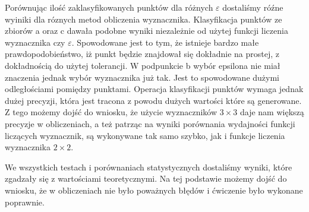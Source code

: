 \quad Porównując ilość zaklasyfikowanych punktów dla różnych $\varepsilon$ dostaliśmy róźne wyiniki 
dla róznych metod obliczenia wyznacznika. 
Klasyfikacja punktów ze zbiorów a oraz c dawała podobne wyniki niezależnie od użytej
funkcji liczenia wyznacznika czy $\varepsilon$. Spowodowane jest to tym, że
istnieje bardzo małe prawdopodobieństwo, iż punkt będzie znajdował się
dokładnie na prostej, z dokładnością do użytej tolerancji. W podpunkcie
b wybór epsilona nie miał znaczenia jednak wybór wyznacznika już tak.
Jest to spowodowane dużymi odległościami pomiędzy punktami. Operacja klasyfikacji punktów wymaga jednak
dużej precyzji, która jest tracona z powodu dużych wartości które są
generowane. Z tego możemy dojść do wniosku, że użycie wyznaczników $3 \times 3$ daje 
nam większą precyzje w obliczeniach, a też patrząc na wyniki porównania wydajności funkcji 
liczących wyznacznik, są wykonywane tak samo szybko, jak i funkcje liczenia wyznacznika $2 \times 2$.
\par
\quad We wszystkich testach i porównaniach statystycznych dostaliśmy 
wyniki, które zgadzały się z wartościami teoretycznymi. Na tej 
podstawie możemy dojść do wniosku, że w obliczeniach nie było poważnych 
błędów i ćwiczenie było wykonane poprawnie.
